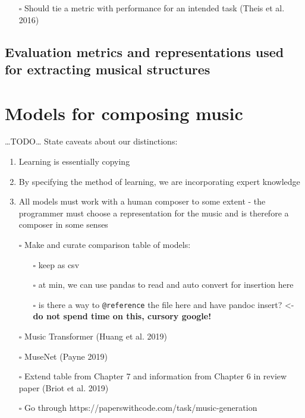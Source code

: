 \documentclass[12pt,a4paper,]{report}
\providecommand{\tightlist}{%
  \setlength{\itemsep}{0pt}\setlength{\parskip}{0pt}}
\begin{document}
\begin{itemize}
\tightlist
\item[$\square$]
  Should tie a metric with performance for an intended task (Theis et
  al. 2016)
\end{itemize}

\hypertarget{evaluation-metrics-and-representations-used-for-extracting-musical-structures}{%
\subsection{Evaluation metrics and representations used for extracting
musical
structures}\label{evaluation-metrics-and-representations-used-for-extracting-musical-structures}}

\hypertarget{models-for-composing-music}{%
\section{Models for composing music}\label{models-for-composing-music}}

\ldots TODO\ldots{} State caveats about our distinctions:

\begin{enumerate}
\def\labelenumi{\arabic{enumi}.}
\tightlist
\item
  Learning is essentially copying
\item
  By specifying the method of learning, we are incorporating expert
  knowledge
\item
  All models must work with a human composer to some extent - the
  programmer must choose a representation for the music and is therefore
  a composer in some senses
\end{enumerate}

\begin{itemize}
\tightlist
\item[$\square$]
  Make and curate comparison table of models:

  \begin{itemize}
  \tightlist
  \item[$\square$]
    keep as csv
  \item[$\square$]
    at min, we can use pandas to read and auto convert for insertion
    here
  \item[$\square$]
    is there a way to \texttt{@reference} the file here and have pandoc
    insert? \textless- \textbf{do not spend time on this, cursory
    google!}
  \end{itemize}
\item[$\square$]
  Music Transformer (Huang et al. 2019)
\item[$\square$]
  MuseNet (Payne 2019)
\item[$\square$]
  Extend table from Chapter 7 and information from Chapter 6 in review
  paper (Briot et al. 2019)
\item[$\square$]
  Go through https://paperswithcode.com/task/music-generation
\end{itemize}
\end{document}
